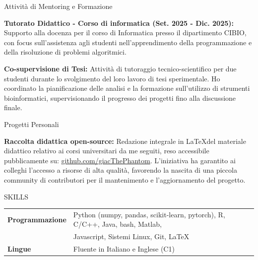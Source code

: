 \documentclass{resume} %
\begin{document}

\begin{rSection}{Attivit\`a di Mentoring e Formazione}
\vspace{-1.25em}

\item \textbf{Tutorato Didattico - Corso di informatica (Set. 2025 - Dic. 2025): }{
Supporto alla docenza per il corso di Informatica presso il dipartimento CIBIO, con focus sull'assistenza agli studenti nell'apprendimento della programmazione e della risoluzione di problemi algoritmici.
   }
\item \textbf{Co-supervisione di Tesi: }{Attività di tutoraggio tecnico-scientifico per due studenti durante lo svolgimento del loro lavoro di tesi sperimentale. Ho coordinato la pianificazione delle analisi e la formazione sull’utilizzo di strumenti bioinformatici, supervisionando il progresso dei progetti fino alla discussione finale.}
\end{rSection}

\begin{rSection}{Progetti Personali}
\vspace{-1.25em}

\item \textbf{Raccolta didattica open-source: }{
      Redazione integrale in \LaTeX del materiale didattico relativo ai corsi universitari da me seguiti, reso accessibile pubblicamente su: {\href{https://github.com/giacThePhantom}{github.com/giacThePhantom}}.
      L'iniziativa ha garantito ai colleghi l'accesso a risorse di alta qualit\`a, favorendo la nascita di una piccola community di contributori per il mantenimento e l'aggiornamento del progetto.
   }
\end{rSection}


\begin{rSection}{SKILLS}

\begin{tabular}{ @{} >{\bfseries}l @{\hspace{6ex}} l }
Programmazione & Python (numpy, pandas, scikit-learn, pytorch), R, C/C++, Java, bash, Matlab, \\
 &Javascript, Sistemi Linux, Git, \LaTeX\\
Lingue & Fluente in Italiano e Inglese (C1)
\end{tabular}\\
\end{rSection}
\end{document}
